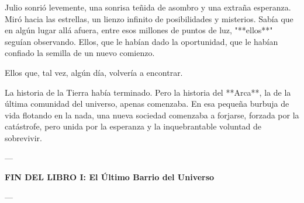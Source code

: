 \documentclass[a4paper,12pt]{book}
\begin{document}
Julio sonrió levemente, una sonrisa teñida de asombro y una extraña esperanza. Miró hacia las estrellas, un lienzo infinito de posibilidades y misterios. Sabía que en algún lugar allá afuera, entre esos millones de puntos de luz, "**ellos**" seguían observando. Ellos, que le habían dado la oportunidad, que le habían confiado la semilla de un nuevo comienzo.

Ellos que, tal vez, algún día, volvería a encontrar.

La historia de la Tierra había terminado. Pero la historia del **Arca**, la de la última comunidad del universo, apenas comenzaba. En esa pequeña burbuja de vida flotando en la nada, una nueva sociedad comenzaba a forjarse, forzada por la catástrofe, pero unida por la esperanza y la inquebrantable voluntad de sobrevivir.

---
\begin{center}
    \textbf{FIN DEL LIBRO I: El Último Barrio del Universo}
\end{center}
---
\end{document}
